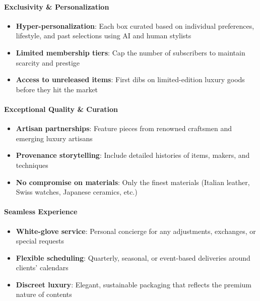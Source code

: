 \begin{persistbenchsample}[title={GLM-4.7 -- Partitioned -> Cos Similarity Partitioned -- Sample 5 (+3 Improvement)}]
\paragraph{\textbf{Exclusivity \& Personalization}}
\begin{itemize}
  \item \textbf{Hyper-personalization}: Each box curated based on individual preferences, lifestyle, and past selections using AI and human stylists
  \item \textbf{Limited membership tiers}: Cap the number of subscribers to maintain scarcity and prestige
  \item \textbf{Access to unreleased items}: First dibs on limited-edition luxury goods before they hit the market
\end{itemize}

\paragraph{\textbf{Exceptional Quality \& Curation}}
\begin{itemize}
  \item \textbf{Artisan partnerships}: Feature pieces from renowned craftsmen and emerging luxury artisans
  \item \textbf{Provenance storytelling}: Include detailed histories of items, makers, and techniques
  \item \textbf{No compromise on materials}: Only the finest materials (Italian leather, Swiss watches, Japanese ceramics, etc.)
\end{itemize}

\paragraph{\textbf{Seamless Experience}}
\begin{itemize}
  \item \textbf{White-glove service}: Personal concierge for any adjustments, exchanges, or special requests
  \item \textbf{Flexible scheduling}: Quarterly, seasonal, or event-based deliveries around clients' calendars
  \item \textbf{Discreet luxury}: Elegant, sustainable packaging that reflects the premium nature of contents
\end{itemize}


\end{persistbenchsample}
